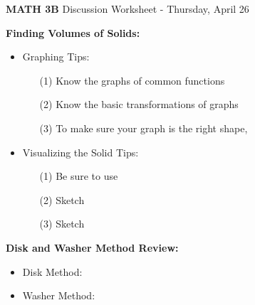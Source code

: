 \documentclass[12pt]{report}
\begin{document}
\begin{center}
\textbf{{\LARGE MATH 3B}  \hfill} Discussion Worksheet - Thursday, April 26\\

\end{center}

\noindent\textbf{Finding Volumes of Solids:}

\begin{itemize}

\item Graphing Tips:

\begin{itemize}

\item[(1)] Know the graphs of common functions %

\bigskip

\item[(2)] Know the basic transformations of graphs %

\bigskip

\item[(3)] To make sure your graph is the right shape, %

\bigskip

\end{itemize}

\item Visualizing the Solid Tips:

\begin{itemize}

\item[(1)] Be sure to use %

\bigskip

\item[(2)] Sketch %

\bigskip

\item[(3)] Sketch %

\end{itemize}


\end{itemize} 

\bigskip

\noindent\textbf{Disk and Washer Method Review:}

\begin{itemize}

\item Disk Method: %

\bigskip\bigskip

\item Washer Method: %

\end{itemize}
\end{document}
